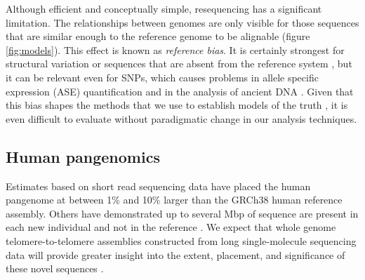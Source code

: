 Although efficient and conceptually simple, resequencing has a significant limitation.
The relationships between genomes are only visible for those sequences that are similar enough to the reference genome to be alignable (figure \ref{fig:models}).
This effect is known as \emph{reference bias}.
It is certainly strongest for structural variation or sequences that are absent from the reference system \cite{sudmant2015integrated}, but it can be relevant even for SNPs, which causes problems in allele specific expression (ASE) quantification \cite{Castel2015-ef} and in the analysis of ancient DNA \cite{zhou2017antcaller}.
Given that this bias shapes the methods that we use to establish models of the truth \cite{zook2014integrating}, it is even difficult to evaluate without paradigmatic change in our analysis techniques.

\subsection{Human pangenomics}

Estimates based on short read sequencing data have placed the human pangenome at between 1\% \cite{li2010building} and 10\% \cite{sherman2019assembly} larger than the GRCh38 human reference assembly.
Others have demonstrated up to several Mbp of sequence are present in each new individual and not in the reference \cite{Hehir-Kwa2016-hb,Audano_2019}.
We expect that whole genome telomere-to-telomere assemblies constructed from long single-molecule sequencing data will provide greater insight into the extent, placement, and significance of these novel sequences \cite{miga2019telomere,Langley_2019}.

